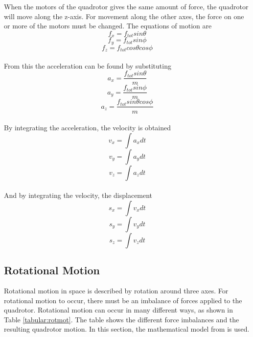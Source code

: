 When the motors of the quadrotor gives the same amount of force, the quadrotor will move along the z-axis. For movement along the other axes, the force on one or more of the motors must be changed. The equations of motion are
\\
\begin{equation}
f_x = f_{tot}sin\theta
\end{equation}
\begin{equation}
f_y = f_{tot}sin\phi
\end{equation}
\begin{equation}
f_z = f_{tot}cos\theta cos\phi
\end{equation}
\\
From this the acceleration can be found by substituting
\\
\begin{equation}
a_x = \frac{f_{tot}sin\theta}{m}
\end{equation}
\begin{equation}
a_y = \frac{f_{tot}sin\phi}{m}
\end{equation}
\begin{equation}
a_z = \frac{f_{tot}sin\theta cos\phi}{m}
\end{equation}
\\
By integrating the acceleration, the velocity is obtained
\begin{equation}
v_x = \int a_xdt
\end{equation}
\begin{equation}
v_y = \int a_ydt
\end{equation}
\begin{equation}
v_z = \int a_zdt
\end{equation}
\\
And by integrating the velocity, the displacement
\begin{equation}
s_x = \int v_xdt
\end{equation}
\begin{equation}
s_y = \int v_ydt
\end{equation}
\begin{equation}
s_z = \int v_zdt
\end{equation}
\clearpage

\subsection{Rotational Motion}
Rotational motion in space is described by rotation around three axes. For rotational motion to occur, there must be an imbalance of forces applied to the quadrotor. Rotational motion can occur in many different ways, as shown in Table \ref{tabular:rotmot}. The table shows the different force imbalances and the resulting quadrotor motion. In this section, the mathematical model from \cite{charlesdarwinuni} is used. \bigskip

